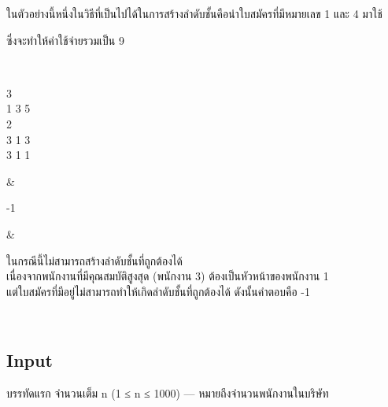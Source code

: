 \documentclass{article}
\begin{document}
{\begin{longtable}[]
\begin{minipage}[t]{\linewidth}
ในตัวอย่างนี้หนึ่งในวิธีที่เป็นไปได้ในการสร้างลำดับชั้นคือนำใบสมัครที่มีหมายเลข 1 และ 4 มาใช้

ซึ่งจะทำให้ค่าใช้จ่ายรวมเป็น 9\\

\strut

\end{minipage} \\

\begin{minipage}[t]{\linewidth}\raggedright

3\\

1 3 5\\

2\\

3 1 3\\

3 1 1\\

\strut

\end{minipage} & \begin{minipage}[t]{\linewidth}\raggedright

-1\\

\strut

\end{minipage} & \begin{minipage}[t]{\linewidth}\raggedright

ในกรณีนี้ไม่สามารถสร้างลำดับชั้นที่ถูกต้องได้\\

เนื่องจากพนักงานที่มีคุณสมบัติสูงสุด (พนักงาน 3) ต้องเป็นหัวหน้าของพนักงาน 1\\

แต่ใบสมัครที่มีอยู่ไม่สามารถทำให้เกิดลำดับชั้นที่ถูกต้องได้ ดังนั้นคำตอบคือ -1\\

\strut

\end{minipage} \\

\end{longtable}

}



\subsection*{Input}
บรรทัดแรก จำนวนเต็ม n (1 ≤ n ≤ 1000) --- หมายถึงจำนวนพนักงานในบริษัท
\end{document}
